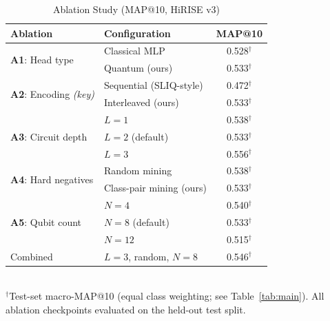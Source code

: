 \documentclass[conference,a4paper]{IEEEtran}
\begin{document}
\begin{table}[t]
  \centering
  \caption{Ablation Study (MAP@10, HiRISE v3)}
  \label{tab:ablation}
  \setlength{\tabcolsep}{4pt}
  \begin{tabular}{llc}
    \toprule
    Ablation               & Configuration              & MAP@10         \\
    \midrule
    \multirow{2}{*}{\textbf{A1}: Head type}
                           & Classical MLP              & 0.528$^\dagger$\\
                           & Quantum (ours)             & 0.533$^\dagger$\\
    \midrule
    \multirow{2}{*}{\textbf{A2}: Encoding \emph{(key)}}
                           & Sequential (SLIQ-style)    & 0.472$^\dagger$\\
                           & Interleaved (ours)         & 0.533$^\dagger$\\
    \midrule
    \multirow{3}{*}{\textbf{A3}: Circuit depth}
                           & $L=1$                      & 0.538$^\dagger$\\
                           & $L=2$ (default)            & 0.533$^\dagger$\\
                           & $L=3$                      & 0.556$^\dagger$\\
    \midrule
    \multirow{2}{*}{\textbf{A4}: Hard negatives}
                           & Random mining              & 0.538$^\dagger$\\
                           & Class-pair mining (ours)   & 0.533$^\dagger$\\
    \midrule
    \multirow{3}{*}{\textbf{A5}: Qubit count}
                           & $N=4$                      & 0.540$^\dagger$\\
                           & $N=8$ (default)            & 0.533$^\dagger$\\
                           & $N=12$                     & 0.515$^\dagger$\\
    \midrule
    Combined               & $L{=}3$, random, $N{=}8$  & 0.546$^\dagger$\\
    \bottomrule
  \end{tabular}
  \vspace{2pt}
  \\\footnotesize $^\dagger$Test-set macro-MAP@10 (equal class weighting; see Table~\ref{tab:main}).
  All ablation checkpoints evaluated on the held-out test split.
\end{table}
\end{document}
